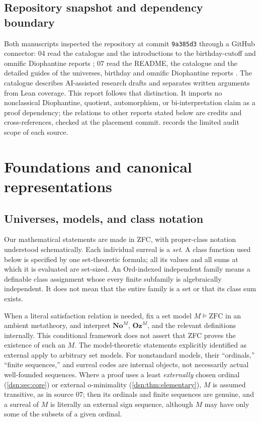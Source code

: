 \documentclass[11pt,a4paper]{article}
\numberwithin{equation}{section}
\theoremstyle{definition}
\theoremstyle{remark}
\newcommand{\No}{\mathbf{No}}
\newcommand{\Oz}{\mathbf{Oz}}
\newcommand{\Ord}{\mathrm{Ord}}
\newcommand{\ZFC}{\mathrm{ZFC}}
\begin{document}
\subsection{Repository snapshot and dependency boundary}

Both manuscripts inspected the repository at commit \texttt{9a385d3} through a
GitHub connector: 04 read the catalogue and the introductions to the
birthday-cutoff and omnific Diophantine reports \cite{Repo,RepoHset,RepoOdg};
07 read the README, the catalogue and the detailed guides of the universes,
birthday and omnific Diophantine reports \cite{RepoUniv}. The catalogue
describes AI-assisted research drafts and separates written arguments from
Lean coverage. This report follows that distinction. It imports no
nonclassical Diophantine, quotient, automorphism, or bi-interpretation
claim as a proof dependency; the relations to other reports stated below
are credits and cross-references, checked at the placement commit.
 records the limited audit scope of each source.

\section{Foundations and canonical representations}
\label{dsn:sec:foundations}

\subsection{Universes, models, and class notation}

Our mathematical statements are made in ZFC, with proper-class notation
understood schematically. Each individual surreal is a \emph{set}.
A class function used below is specified by one set-theoretic formula;
all its values and all sums at which it is evaluated are set-sized.
An $\Ord$-indexed independent family means a definable class assignment
whose every finite subfamily is algebraically independent. It does not
mean that the entire family is a set or that its class sum exists.

When a literal satisfaction relation is needed, fix a set model
$M\models\ZFC$ in an ambient metatheory, and interpret $\No^M$, $\Oz^M$,
and the relevant definitions internally. This conditional framework does
not assert that ZFC proves the existence of such an $M$. The model-theoretic
statements explicitly identified as external apply to arbitrary set
models. For nonstandard models, their ``ordinals,'' ``finite sequences,''
and surreal codes are internal objects, not necessarily actual well-founded
sequences. Where a proof uses a least \emph{externally} chosen ordinal
(\cref{dsn:sec:core}) or external o-minimality (\cref{dsn:thm:elementary}),
$M$ is assumed transitive, as in source 07; then its ordinals and
finite sequences are genuine, and a surreal of $M$ is literally an
external sign sequence, although $M$ may have only some of the subsets of
a given ordinal.
\end{document}
